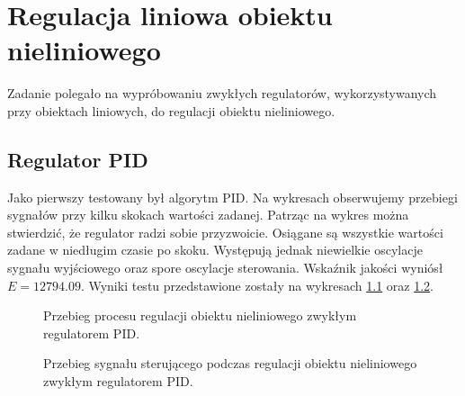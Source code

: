 \chapter{Regulacja liniowa obiektu nieliniowego}
\label{lab3}

Zadanie polegało na wypróbowaniu zwykłych regulatorów, wykorzystywanych przy obiektach liniowych, do regulacji obiektu nieliniowego.

\section{Regulator PID}
Jako pierwszy testowany był algorytm PID. Na wykresach obserwujemy przebiegi sygnałów przy kilku skokach wartości zadanej. Patrząc na wykres można stwierdzić, że regulator radzi sobie przyzwoicie. Osiągane są wszystkie wartości zadane w niedługim czasie po skoku. Występują jednak niewielkie oscylacje sygnału wyjściowego oraz spore oscylacje sterowania. Wskaźnik jakości wyniósł $E = \num{12794.09}$. Wyniki testu przedstawione zostały na wykresach \ref{reg_PID} oraz \ref{reg_PID_u}.

\begin{figure}[t]
    \centering
    \caption{Przebieg procesu regulacji obiektu nieliniowego zwykłym regulatorem PID.}
    \label{reg_PID}
\end{figure}

\begin{figure}[b]
    \centering
    \caption{Przebieg sygnału sterującego podczas regulacji obiektu nieliniowego zwykłym regulatorem PID.}
    \label{reg_PID_u}
\end{figure}

